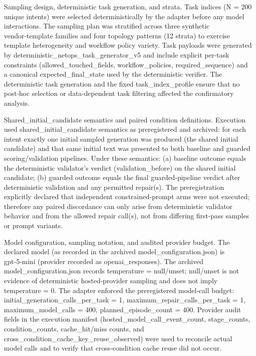 \documentclass[conference]{IEEEtran}
\begin{document}
Sampling design, deterministic task generation, and strata. Task indices (N = 200 unique intents) were selected deterministically by the adapter before any model interactions. The sampling plan was stratified across three synthetic vendor‑template families and four topology patterns (12 strata) to exercise template heterogeneity and workflow policy variety. Task payloads were generated by deterministic\_netops\_task\_generator\_v5 and include explicit per‑task constraints (allowed\_touched\_fields, workflow\_policies, required\_sequence) and a canonical expected\_final\_state used by the deterministic verifier. The deterministic task generation and the fixed task\_index\_profile ensure that no post‑hoc selection or data‑dependent task filtering affected the confirmatory analysis.

Shared\_initial\_candidate semantics and paired condition definitions. Execution used shared\_initial\_candidate semantics as preregistered and archived: for each intent exactly one initial sampled generation was produced (the shared initial candidate) and that same initial text was presented to both baseline and guarded scoring/validation pipelines. Under these semantics: (a) baseline outcome equals the deterministic validator's verdict (validation\_before) on the shared initial candidate; (b) guarded outcome equals the final guarded‑pipeline verdict after deterministic validation and any permitted repair(s). The preregistration explicitly declared that independent constrained‑prompt arms were not executed; therefore any paired discordance can only arise from deterministic validator behavior and from the allowed repair call(s), not from differing first‑pass samples or prompt variants.

Model configuration, sampling notation, and audited provider budget. The declared model (as recorded in the archived model\_configuration.json) is gpt‑5‑mini (provider recorded as openai\_responses). The archived model\_configuration.json records temperature = null/unset; null/unset is not evidence of deterministic hosted‑provider sampling and does not imply temperature = 0. The adapter enforced the preregistered model‑call budget: initial\_generation\_calls\_per\_task = 1, maximum\_repair\_calls\_per\_task = 1, maximum\_model\_calls = 400, planned\_episode\_count = 400. Provider audit fields in the execution manifest (hosted\_model\_call\_event\_count, stage\_counts, condition\_counts, cache\_hit/miss counts, and cross\_condition\_cache\_key\_reuse\_observed) were used to reconcile actual model calls and to verify that cross‑condition cache reuse did not occur.
\end{document}
